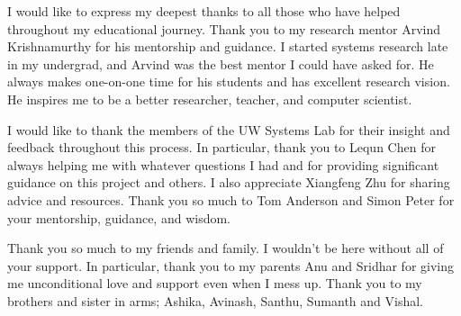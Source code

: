 I would like to express my deepest thanks to all those who have helped throughout my educational journey.
Thank you to my research mentor Arvind Krishnamurthy for his mentorship and guidance. I started systems research late in my undergrad, and Arvind was the best mentor I could have asked for. He always makes one-on-one time for his students and has excellent research vision. He inspires me to be a better researcher, teacher, and computer scientist. 

I would like to thank the members of the UW Systems Lab for their insight and feedback throughout
this process. In particular, thank you to Lequn Chen for always helping me with whatever questions I had and for providing significant guidance on this project and others. I also appreciate Xiangfeng Zhu for sharing advice and resources. Thank you so much to Tom Anderson and Simon Peter for your mentorship, guidance, and wisdom. 

Thank you so much to my friends and family. I wouldn't be here without all of your support. In particular, thank you to my parents Anu and Sridhar for giving me unconditional love and support even when I mess up. Thank you to my brothers and sister in arms; Ashika, Avinash, Santhu, Sumanth and Vishal.
